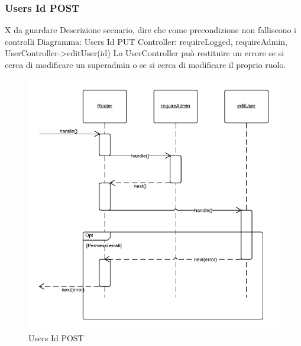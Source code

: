 \subsubsection{Users Id POST} X da guardare
Descrizione scenario, dire che come precondizione non falliscono i controlli
Diagramma: Users Id PUT
Controller: requireLogged, requireAdmin, UserController->editUser(id)
Lo UserController può restituire un errore se si cerca di modificare un superadmin o se si cerca di modificare il proprio ruolo.
\begin{figure}[H]
	\begin{center} 
		\includegraphics[scale=0.60]{scenari/Users Id POST.png} 
		\caption{Users Id POST}
	\end{center} 
\end{figure}


